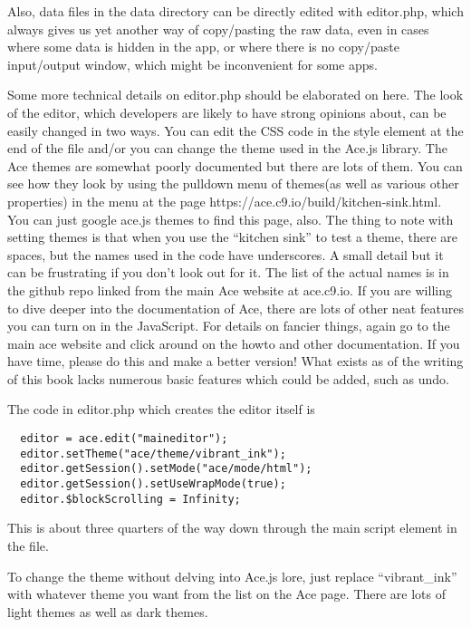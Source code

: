 Also, data files in the data directory can be directly edited with editor.php, which always gives us yet another way of copy/pasting the raw data, even in cases where some data is hidden in the app, or where there is no copy/paste input/output window, which might be inconvenient for some apps.

Some more technical details on editor.php should be elaborated on here.  The look of the editor, which developers are likely to have strong opinions about, can be easily changed in two ways.  You can edit the CSS code in the style element at the end of the file and/or you can change the theme used in the Ace.js library.  The Ace themes are somewhat poorly documented but there are lots of them.  You can see how they look by using the pulldown menu of themes(as well as various other properties) in the menu at the page https://ace.c9.io/build/kitchen-sink.html. You can just google ace.js themes to find this page, also.  The thing to note with setting themes is that when you use the ``kitchen sink'' to test a theme, there are spaces, but the names used in the code have underscores.  A small detail but it can be frustrating if you don't look out for it.  The list of the actual names is in the github repo linked from the main Ace website at ace.c9.io.  If you are willing to dive deeper into the documentation of Ace, there are lots of other neat features you can turn on in the JavaScript.  For details on fancier things, again go to the main ace website and click around on the howto and other documentation.  If you have time, please do this and make a better version! What exists as of the writing of this book lacks numerous basic features which could be added, such as undo.

The code in editor.php which creates the editor itself is 

\begin{verbatim}
  editor = ace.edit("maineditor");
  editor.setTheme("ace/theme/vibrant_ink");
  editor.getSession().setMode("ace/mode/html");
  editor.getSession().setUseWrapMode(true);
  editor.$blockScrolling = Infinity;
\end{verbatim}

This is about three quarters of the way down through the main script element in the file. 

To change the theme without delving into Ace.js lore, just replace ``vibrant_ink'' with whatever theme you want from the list on the Ace page. There are lots of light themes as well as dark themes. 

